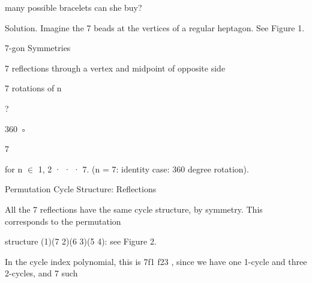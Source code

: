 \documentclass[a4paper,portrait,12pt]{article}
\begin{document}
\begin{flushleft}
many possible bracelets can she buy?
\end{flushleft}


\begin{flushleft}
Solution. Imagine the 7 beads at the vertices of a regular heptagon. See Figure 1.
\end{flushleft}





\begin{flushleft}
7-gon Symmetries
\end{flushleft}


\begin{flushleft}
7 reflections through a vertex and midpoint of opposite side
\end{flushleft}


\begin{flushleft}
7 rotations of n
\end{flushleft}





?


360 ◦


7





\begin{flushleft}
for n $\in$ 1, 2 · · · 7. (n = 7: identity case: 360 degree rotation).
\end{flushleft}





\begin{flushleft}
Permutation Cycle Structure: Reflections
\end{flushleft}


\begin{flushleft}
All the 7 reflections have the same cycle structure, by symmetry. This corresponds to the permutation
\end{flushleft}


\begin{flushleft}
structure (1)(7 2)(6 3)(5 4): see Figure 2.
\end{flushleft}


\begin{flushleft}
In the cycle index polynomial, this is 7f1 f23 , since we have one 1-cycle and three 2-cycles, and 7 such
\end{flushleft}
\end{document}
